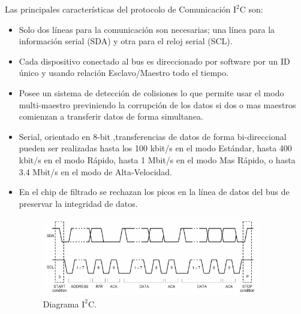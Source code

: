 \documentclass[12pt,a4paper]{article}
\begin{document}
Las principales características del protocolo de Comunicación $\mathrm{I^2C}$ \cite{I2C} son:
\begin{itemize}
\item Solo dos líneas para la comunicación son necesarias; una línea para la información serial (SDA) y otra para el reloj serial (SCL).
\item Cada dispositivo conectado al bus es direccionado por software por un ID único y usando relación Esclavo/Maestro todo el tiempo.
\item Posee un sistema de detección de colisiones lo que permite usar el modo multi-maestro previniendo la corrupción de los datos si dos o mas maestros comienzan a transferir datos de forma simultanea.
\item Serial, orientado en 8-bit ,transferencias de datos de forma bi-direccional pueden ser realizadas hasta los 100 kbit/s en el modo Estándar, hasta 400 kbit/s en el modo Rápido, hasta 1 Mbit/s en el modo Mas Rápido, o hasta 3.4 Mbit/s en el modo de Alta-Velocidad.
\item En el chip de filtrado se rechazan los picos en la línea de datos del bus de preservar la integridad de datos.

\begin{figure}[H]
	\centering
  	\includegraphics[width=0.9\textwidth]{images/Diagrama_I2C}
    \caption{Diagrama $\mathrm{I^2C.}$}
	\label{fig:diagramaI2C}
\end{figure}
\end{itemize}
\end{document}
